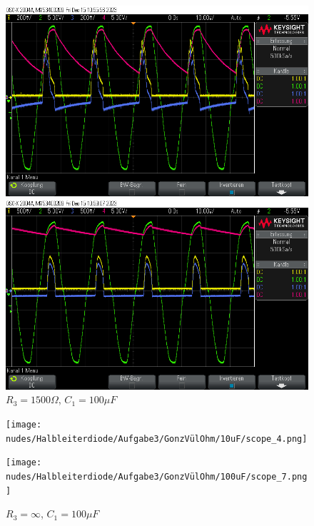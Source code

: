 \documentclass[12pt,a4paper,twoside]{article}
\begin{document}
\begin{figure}[H]
    \begin{minipage}[b]{.5\linewidth} %
        \includegraphics[width=1\linewidth]{nudes/Halbleiterdiode/Aufgabe3/1500Ohm/10uF/a2c2___5.png}
        \caption{$R_3 = 1500 \Omega$, $C_1 = 10 \mu F$}
    \end{minipage}
    \hspace{0.01\linewidth}%
    \begin{minipage}[b]{.5\linewidth} %
        \includegraphics[width=1\linewidth]{nudes/Halbleiterdiode/Aufgabe3/1500Ohm/100uF/a2c2___7.png}
    \caption{$R_3 = 1500 \Omega$, $C_1 = 100 \mu F$}
    \end{minipage}
\end{figure}

\begin{figure}[H]
    \begin{minipage}[b]{.5\linewidth} %
        \texttt{[image: nudes/Halbleiterdiode/Aufgabe3/GonzVülOhm/10uF/scope\_4.png]}
        \caption{$R_3 = \infty$, $C_1 = 10 \mu F$}
    \end{minipage}
    \hspace{0.01\linewidth}%
    \begin{minipage}[b]{.5\linewidth} %
        \texttt{[image: nudes/Halbleiterdiode/Aufgabe3/GonzVülOhm/100uF/scope\_7.png]}
    \caption{$R_3 = \infty$, $C_1 = 100 \mu F$}
    \end{minipage}
\end{figure}
\end{document}
